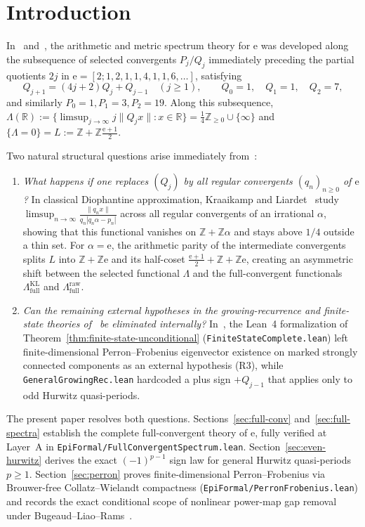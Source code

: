 \documentclass[11pt]{article}
\theoremstyle{definition}
\theoremstyle{remark}
\newcommand{\R}{\mathbb{R}}
\newcommand{\Z}{\mathbb{Z}}
\newcommand{\ee}{\mathrm{e}}
\newcommand{\Lam}{\Lambda}
\begin{document}
\section{Introduction}\label{sec:intro}

In~\cite{Paper2} and~\cite{Phase1}, the arithmetic and metric spectrum theory
for $\ee$ was developed along the subsequence of selected convergents
$P_j/Q_j$ immediately preceding the partial quotients $2j$ in
$\ee=[2;1,2,1,1,4,1,1,6,\dots]$, satisfying
\begin{equation}\label{eq:sel-rec}
Q_{j+1}=(4j+2)Q_j+Q_{j-1}\quad(j\ge1),\qquad Q_0=1,\quad Q_1=1,\quad Q_2=7,
\end{equation}
and similarly $P_0=1, P_1=3, P_2=19$. Along this subsequence,
$\Lam(\R):=\{\limsup_{j\to\infty}j\|Q_j x\|:x\in\R\}=\frac14\Z_{\ge0}\cup\{\infty\}$
and $\{\Lam=0\}=L:=\Z+\Z\frac{\ee+1}{2}$.

Two natural structural questions arise immediately from~\cite{Paper2}:
\begin{enumerate}[label=\textup{(\arabic*)},leftmargin=2.2em]
\item \emph{What happens if one replaces $(Q_j)$ by all regular convergents $(q_n)_{n\ge0}$ of $\ee$?}
In classical Diophantine approximation, Kraaikamp and Liardet~\cite{KL} study
$\limsup_{n\to\infty}\frac{\|q_n x\|}{q_n|q_n\alpha-p_n|}$ across all regular
convergents of an irrational $\alpha$, showing that this functional vanishes on
$\Z+\Z\alpha$ and stays above $1/4$ outside a thin set. For $\alpha=\ee$, the
arithmetic parity of the intermediate convergents splits $L$ into $\Z+\Z\ee$ and
its half-coset $\frac{\ee+1}{2}+\Z+\Z\ee$, creating an asymmetric shift between
the selected functional $\Lam$ and the full-convergent functionals
$\Lam_{\mathrm{full}}^{\mathrm{KL}}$ and $\Lam_{\mathrm{full}}^{\mathrm{raw}}$.
\item \emph{Can the remaining external hypotheses in the growing-recurrence and
finite-state theories of~\cite{Paper2} be eliminated internally?}
In~\cite{Paper2}, the Lean~4 formalization of Theorem~\ref{thm:finite-state-unconditional}
(\texttt{FiniteStateComplete.lean}) left finite-dimensional Perron--Frobenius
eigenvector existence on marked strongly connected components as an external
hypothesis (R3), while \texttt{GeneralGrowingRec.lean} hardcoded a plus sign
$+Q_{j-1}$ that applies only to odd Hurwitz quasi-periods.
\end{enumerate}

The present paper resolves both questions. Sections~\ref{sec:full-conv}
and~\ref{sec:full-spectra} establish the complete full-convergent theory of
$\ee$, fully verified at Layer~A in \texttt{EpiFormal/\allowbreak FullConvergentSpectrum.lean}.
Section~\ref{sec:even-hurwitz} derives the exact $(-1)^{p-1}$ sign law for
general Hurwitz quasi-periods $p\ge1$. Section~\ref{sec:perron} proves
finite-dimensional Perron--Frobenius via Brouwer-free Collatz--Wielandt
compactness (\texttt{EpiFormal/\allowbreak PerronFrobenius.lean}) and records the
exact conditional scope of nonlinear power-map gap removal under Bugeaud--Liao--Rams~\cite{BLR}.
\end{document}
